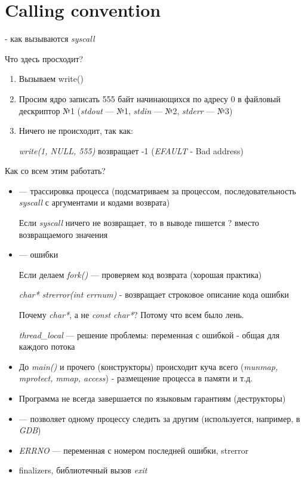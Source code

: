 \documentclass[../../lectures.tex]{subfiles}
\begin{document}
\section{Calling convention}
 - как вызываются \emph{syscall}


Что здесь просходит?
\begin{enumerate}
    \item Вызываем write()
    \item Просим ядро записать 555 байт начинающихся по адресу 0 в файловый дескриптор №1 
          (\emph{stdout} --- №1, \emph{stdin} --- №2, \emph{stderr} --- №3)
    \item Ничего не происходит, так как:

          \emph{write(1, NULL, 555)} возвращает -1 (\emph{EFAULT} - Bad address)
\end{enumerate}

Как со всем этим работать?
\begin{itemize}
    \item {} --- трассировка процесса (подсматриваем за процессом, 
          последовательность \emph{syscall} с аргументами и кодами возврата)

    Если \emph{syscall} ничего не возвращает, то в выводе пишется ? вместо возвращаемого значения

    \item {} --- ошибки

    Если делаем \emph{fork()} --- проверяем код возврата (хорошая практика)

    \emph{char* strerror(int errnum)} - возвращает строковое описание кода ошибки

    Почему \emph{char*}, а не \emph{const char*}? Потому что всем было лень.

    \emph{thread\_local} --- решение проблемы: переменная с ошибкой - общая для каждого потока

    \item До \emph{main()} и прочего (конструкторы) происходит куча всего 
          (\emph{munmap, mprotect, mmap, access}) - размещение процесса в памяти и т.д.

    \item Программа не всегда завершается по языковым гарантиям (деструкторы)

    \item {} --- позволяет одному процессу следить за другим (используется, например, в \emph{GDB})

    \item \emph{ERRNO} --- переменная с номером последней ошибки, strerror

    \item finalizers, библиотечный вызов \emph{exit}
\end{itemize}
\end{document}
